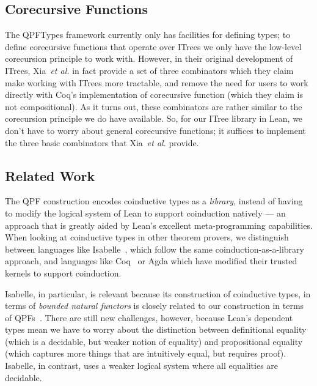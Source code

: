 \documentclass[a4paper]{scrartcl}
\newcommand*{\etal}{~\emph{et al.}}
\begin{document}
\subsection{Corecursive Functions}\label{corecursive-functions}

The QPFTypes framework currently only has facilities for defining types;
to define corecursive functions that operate over ITrees we only have
the low-level corecursion principle to work with. However, in their
original development of ITrees, Xia\etal{} in fact provide a set of three
combinators which they claim make working with ITrees more tractable,
and remove the need for users to work directly with Coq's implementation
of corecursive function (which they claim is not compositional). As it
turns out, these combinators are rather similar to the corecursion
principle we do have available. So, for our ITree library
in Lean, we don't have to worry about general corecursive functions; it
suffices to implement the three basic combinators that Xia\etal{} provide.

\subsection{Related Work}\label{related-work-1}

The QPF construction encodes coinductive types as a \emph{library},
instead of having to modify the logical system of Lean to support
coinduction natively --- an approach that is greatly aided by Lean's
excellent meta-programming capabilities. When looking at coinductive
types in other theorem provers, we distinguish between languages like
Isabelle~\cite{traytelCategoryTheoryBased}, which follow the same
coinduction-as-a-library approach, and languages like Coq~\cite{gimenezTutorialRecursiveTypes1998, gimenezApplicationCoinductiveTypes1996}
or Agda which have modified their trusted kernels to support
coinduction.

Isabelle, in particular, is relevant because its construction of
coinductive types, in terms of \emph{bounded natural functors} is
closely related to our construction in terms of QPFs~\cite{furerQuotientsBoundedNatural2022}. There are still new
challenges, however, because Lean's dependent types mean we have to
worry about the distinction between definitional equality (which is a
decidable, but weaker notion of equality) and propositional equality
(which captures more things that are intuitively equal, but requires
proof). Isabelle, in contrast, uses a weaker logical system where all
equalities are decidable.
\end{document}
